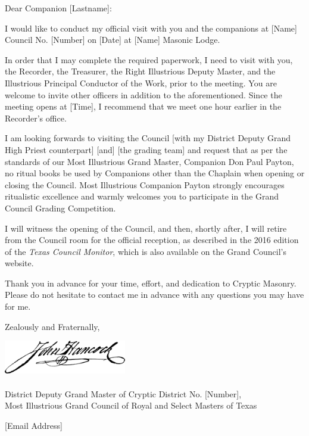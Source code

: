\documentclass{texMemo}
\begin{document}
\maketitle
\pagestyle{empty}

Dear Companion [Lastname]:

I would like to conduct my official visit with you and the companions at [Name] Council No. [Number] on [Date] at [Name] Masonic Lodge. 

In order that I may complete the required paperwork, I need to visit with you, the Recorder, the Treasurer, the Right Illustrious Deputy Master, and the Illustrious Principal Conductor of the Work, prior to the meeting. You are welcome to invite other officers in addition to the aforementioned. Since the meeting opens at [Time], I recommend that we meet one hour earlier in the Recorder’s office.

I am looking forwards to visiting the Council [with my District Deputy Grand High Priest counterpart] [and] [the grading team] and request that as per the standards of our Most Illustrious Grand Master, Companion Don Paul Payton, no ritual books be used by Companions other than the Chaplain when opening or closing the Council. Most Illustrious Companion Payton strongly encourages ritualistic excellence and warmly welcomes you to participate in the Grand Council Grading Competition.

I will witness the opening of the Council, and then, shortly after, I will retire from the Council room for the official reception, as described in the 2016 edition of the \textit{Texas Council Monitor}, which is also available on the Grand Council's website.

Thank you in advance for your time, effort, and dedication to Cryptic Masonry. Please do not hesitate to contact me in advance with any questions you may have for me.

\bigskip
\bigskip

\begin{flushright}
	Zealously and Fraternally,\\
	\bigskip \bigskip
	
	\includegraphics[width=0.4\textwidth]{signature.png}\\
	\\
	District Deputy Grand Master of Cryptic District No. [Number],\\
	Most Illustrious Grand Council of Royal and Select Masters of Texas\\
	
	[Email Address]
\end{flushright}
\end{document}
